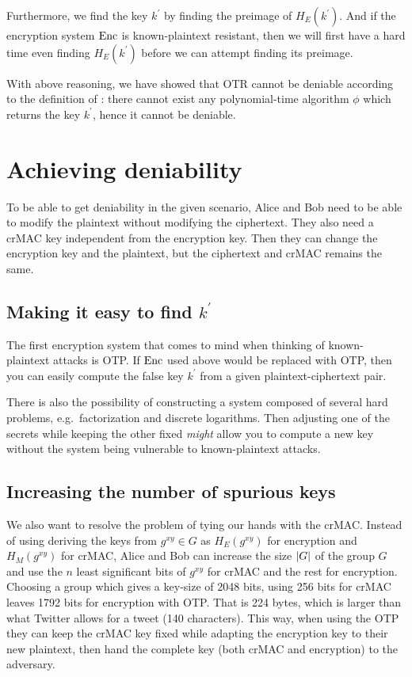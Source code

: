 Furthermore, we find the key \(k^\prime\) by finding the preimage of \(H_E( 
k^\prime )\).
And if the encryption system \(\operatorname{\mathrm{Enc}}\) is known-plaintext resistant, then we 
will first have a hard time even finding \(H_E( k^\prime )\) before we can 
attempt finding its preimage.

With above reasoning, we have showed that \ac{OTR} cannot be deniable according 
to the definition of \cite{deniablecrypt}: there cannot exist any 
polynomial-time algorithm \(\phi\) which returns the key \(k^\prime\), hence it 
cannot be deniable.


\section{Achieving deniability}

To be able to get deniability in the given scenario, Alice and Bob need to be 
able to modify the plaintext without modifying the ciphertext.
They also need a \ac{crMAC} key independent from the encryption key.
Then they can change the encryption key and the plaintext, but the ciphertext 
and \ac{crMAC} remains the same.

\subsection{Making it easy to find \(k^\prime\)}

The first encryption system that comes to mind when thinking of known-plaintext 
attacks is \ac{OTP}.
If \(\operatorname{\mathrm{Enc}}\) used above would be replaced with \ac{OTP}, then you can easily 
compute the false key \(k^\prime\) from a given plaintext-ciphertext pair.

There is also the possibility of constructing a system composed of several hard 
problems, e.g.~factorization and discrete logarithms.
Then adjusting one of the secrets while keeping the other fixed \emph{might} 
allow you to compute a new key without the system being vulnerable to 
known-plaintext attacks.

\subsection{Increasing the number of spurious keys}

We also want to resolve the problem of tying our hands with the \ac{crMAC}.
Instead of using deriving the keys from \(g^{xy}\in G\) as \(H_E(g^{xy})\) for 
encryption and \(H_M(g^{xy})\) for \ac{crMAC}, Alice and Bob can increase the 
size \(|G|\) of the group \(G\) and use the \(n\) least significant bits of 
\(g^{xy}\) for \ac{crMAC} and the rest for encryption.
Choosing a group which gives a key-size of 2048 bits, using 256 bits for 
\ac{crMAC} leaves 1792 bits for encryption with \ac{OTP}.
That is 224 bytes, which is larger than what Twitter allows for a tweet (140 
characters).
This way, when using the \ac{OTP} they can keep the \ac{crMAC} key fixed while 
adapting the encryption key to their new plaintext, then hand the complete key 
(both \ac{crMAC} and encryption) to the adversary.

